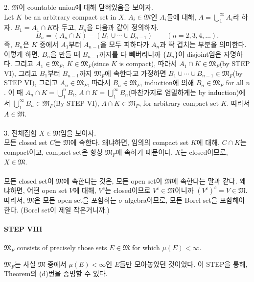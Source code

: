 \documentclass[11pt,reqno]{amsart}
\renewcommand{\(}{\left(}
\renewcommand{\)}{\right)}
\renewcommand{\[}{\left[}
\renewcommand{\]}{\right]}
\newcommand{\subheading}[1]{\vspace{1em}{\noindent\large\bfseries \textlangle{} #1 \textrangle{} \par}\vspace{1em}}
\newcommand{\M}{\mathfrak{M}}
\begin{document}
2. $\M$이 countable union에 대해 닫혀있음을 보이자. \\
Let $K$ be an arbitrary compact set in $X$.
$A_i \in \M$인 $A_i$들에 대해, $A = \bigcup _1^\infty A_i$라 하자. $B_1 = A_1 \cap K$라 두고, $B_n$을 다음과
같이 정의하자.
\begin{equation}
  B_n = (A_n \cap K) - (B_1 \cup \cdots \cup B_{n-1}) \qquad (n = 2, 3, 4, \dots).
\end{equation}
즉, $B_n$은 $K$ 중에서 $A_1$부터 $A_{n-1}$을 모두 피하다가 $A_n$과 딱 겹치는 부분을 의미한다. 이렇게 하면, 
$B_n$을 만들 때 $B_{n-1}$까지를 다 빼버리니까 $\{B_n\}$이 disjoint임은 자명하다. 그리고 $A_1 \in \M_F$, 
$K \in \M_F$(since $K$ is compact), 따라서 $A_1 \cap K \in \M_F$(by STEP VI), 그리고 $B_1$부터 $B_{n-1}$까지 
$\M_F$에 속한다고 가정하면 $B_1 \cup \cdots \cup B_{n-1} \in \M_F$(by STEP VI), 그리고 $A_n \in \M_F$,
따라서 $B_n \in \M_F$, induction에 의해 $B_n \in \M_F$ for all $n$. 이 때 $A_n \cap K = \bigcup _1^n B_i$, 
$A \cap K = \bigcup _1^\infty B_n$(마찬가지로 엄밀하게는 by induction)에서 $\bigcup _1^\infty B_n \in 
\M_F$(By STEP VI), $A \cap K \in \M_F$, for arbitrary compact set $K$. 따라서 $A \in \M$. \\ \\

3. 전체집합 $X \in \M$임을 보이자. \\
모든 closed set $C$는 $\M$에 속한다. 왜냐하면, 임의의 compact set $K$에 대해, $C \cap K$는 compact이고, 
compact set은 항상 $\M_F$에 속하기 때문이다. $X$는 closed이므로, $X \in \M$. \\ \\

모든 closed set이 $\M$에 속한다는 것은, 모든 open set이 $\M$에 속한다는 말과 같다. 왜냐하면, 어떤 open set $V$에 
대해, $V^c$는 closed이므로 $V^c \in \M$이니까 $(V^c)^c = V \in \M$. 따라서, $\M$은 모든 open set을 포함하는 
$\sigma$-algebra이므로, 모든 Borel set을 포함해야 한다. (Borel set이 제일 작은거니까.)

\paragraph{STEP VIII}

$\M_F$ consists of precisely those sets $E \in \M$ for which $\mu (E) < \infty$.

$\M_F$는 사실 $\M$ 중에서 $\mu(E)<\infty$인 $E$들만 모아놓았던 것이었다. 이 STEP을 통해, Theorem의 (d)번을 
증명할 수 있다.

\subheading{proof}
\end{document}
